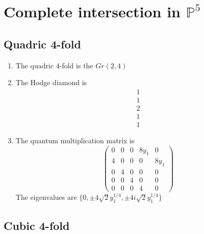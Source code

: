 \documentclass[11pt]{amsart}
\newcounter{num}[section] %
\begin{document}
\section{Complete intersection in $\mathbb{P}^5$}


\subsection{Quadric 4-fold}

\begin{enumerate}
    \item [1)] The quadric 4-fold is the $Gr(2,4)$

\item[2)] The Hodge diamond is
\[
    \begin{array}{c}
         1  \\
          1\\
          2\\
          1\\
          1
    \end{array}
\]
    
    \item[3)] The quantum multiplication matrix is
    \[
    \begin{pmatrix}
        0 & 0 & 0 & 8y_1 & 0 \\
        4 & 0 & 0 & 0 & 8y_1 \\
        0 & 4 & 0 & 0 & 0 \\
        0 & 0 & 4 & 0 & 0 \\
        0 & 0 & 0 & 4 & 0
    \end{pmatrix}
    \]
The eigenvalues are $\{0,\pm 4 \sqrt{2}y_{1}^{1/4} ,\pm 4i \sqrt{2}y_{1}^{1/4} \}$
\end{enumerate}


\subsection{Cubic 4-fold}
\end{document}
